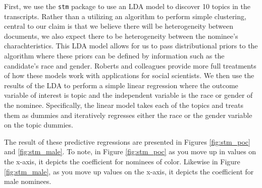 \documentclass [12pt]{article}
\begin{document}
First, we use the \verb|stm| package \citeyearpar[see][]{roberts_et-al_2019} to use an LDA model to discover 10 topics in the transcripts. Rather than a utilizing an algorithm to perform simple clustering, central to our claim is that we believe there will be heterogeneity between documents, we also expect there to be heterogeneity between the nominee's charachteristics. This LDA model allows for us to pass distributional priors to the algorithm where these priors can be defined by information such as the candidate's race and gender. Roberts and colleagues \citeyearpar[][]{roberts_et-al_2014, grimmer_et-al_2021} provide more full treatments of how these models work with applications for social scientists. We then use the results of the LDA to perform a simple linear regression where the outcome variable of interest is topic and the independent variable is the race or gender of the nominee. Specifically, the linear model takes each of the topics and treats them as dummies and iteratively regresses either the race or the gender variable on the topic dummies.  
	    
The result of these predictive regressions are presented in Figures \ref{fig:stm_poc} and \ref{fig:stm_male}. To note, in Figure \ref{fig:stm_poc} as you move up in values on the x-axis, it depicts the coefficient for nominees of color. Likewise in Figure \ref{fig:stm_male}, as you move up values on the x-axis, it depicts the coefficient for male nominees. 
\end{document}

